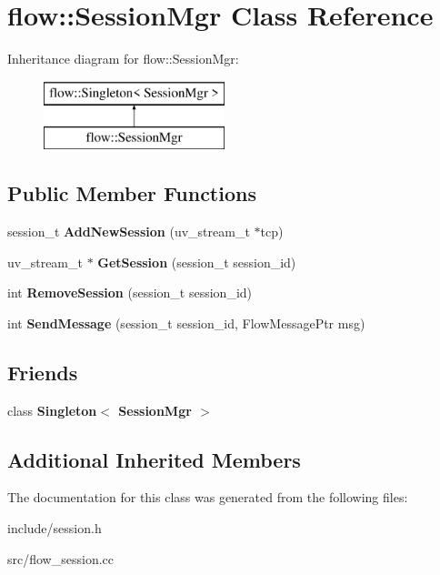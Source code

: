\hypertarget{classflow_1_1_session_mgr}{}\section{flow\+:\+:Session\+Mgr Class Reference}
\label{classflow_1_1_session_mgr}
Inheritance diagram for flow\+:\+:Session\+Mgr\+:\begin{figure}[H]
\begin{center}
\leavevmode
\includegraphics[height=2.000000cm]{classflow_1_1_session_mgr}
\end{center}
\end{figure}
\subsection*{Public Member Functions}
\begin{DoxyCompactItemize}
\item 
session\+\_\+t {\bfseries Add\+New\+Session} (uv\+\_\+stream\+\_\+t $\ast$tcp)\hypertarget{classflow_1_1_session_mgr_a50185fd18962abefd125ec9ab48e5d89}{}\label{classflow_1_1_session_mgr_a50185fd18962abefd125ec9ab48e5d89}

\item 
uv\+\_\+stream\+\_\+t $\ast$ {\bfseries Get\+Session} (session\+\_\+t session\+\_\+id)\hypertarget{classflow_1_1_session_mgr_a453add2b25614fb109b91a5c660d2bd9}{}\label{classflow_1_1_session_mgr_a453add2b25614fb109b91a5c660d2bd9}

\item 
int {\bfseries Remove\+Session} (session\+\_\+t session\+\_\+id)\hypertarget{classflow_1_1_session_mgr_a223fde61f1db9c4a553ee9d7a631b1c6}{}\label{classflow_1_1_session_mgr_a223fde61f1db9c4a553ee9d7a631b1c6}

\item 
int {\bfseries Send\+Message} (session\+\_\+t session\+\_\+id, Flow\+Message\+Ptr msg)\hypertarget{classflow_1_1_session_mgr_abc424fbcdaf54863f2854c03ded6fbd7}{}\label{classflow_1_1_session_mgr_abc424fbcdaf54863f2854c03ded6fbd7}

\end{DoxyCompactItemize}
\subsection*{Friends}
\begin{DoxyCompactItemize}
\item 
class {\bfseries Singleton$<$ Session\+Mgr $>$}\hypertarget{classflow_1_1_session_mgr_ae23bb7049ef768277a505f6646bed941}{}\label{classflow_1_1_session_mgr_ae23bb7049ef768277a505f6646bed941}

\end{DoxyCompactItemize}
\subsection*{Additional Inherited Members}


The documentation for this class was generated from the following files\+:\begin{DoxyCompactItemize}
\item 
include/session.\+h\item 
src/flow\+\_\+session.\+cc\end{DoxyCompactItemize}
